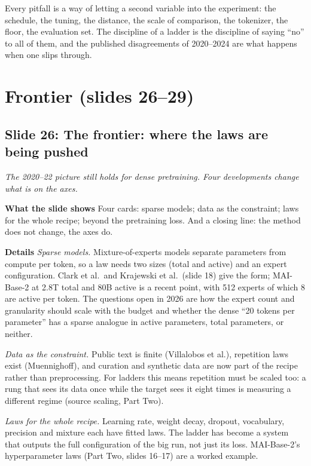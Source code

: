 \documentclass[11pt,letterpaper]{article}
\newcommand{\setstage}[1]{\colorlet{stagec}{#1}}
\newcommand{\slide}[3]{%
  \subsection[Slide #1: #2]{Slide #1: #2}%
  {\color{muted}\itshape #3\par}\medskip}
\newcommand{\para}[1]{\medskip\noindent\textbf{#1}\quad}
\newenvironment{intuition}{\begin{tcolorbox}[intuitionbox]}{\end{tcolorbox}}
\begin{document}
\begin{intuition}
Every pitfall is a way of letting a second variable into the experiment: the schedule, the tuning, the distance, the scale of comparison, the tokenizer, the floor, the evaluation set. The discipline of a ladder is the discipline of saying ``no'' to all of them, and the published disagreements of 2020--2024 are what happens when one slips through.
\end{intuition}

\setstage{vc}
\section{Frontier (slides 26--29)}

\slide{26}{The frontier: where the laws are being pushed}{The 2020--22 picture still holds for dense pretraining. Four developments change what is on the axes.}

\para{What the slide shows} Four cards: sparse models; data as the constraint; laws for the whole recipe; beyond the pretraining loss. And a closing line: the method does not change, the axes do.

\para{Details} \emph{Sparse models.} Mixture-of-experts models separate parameters from compute per token, so a law needs two sizes (total and active) and an expert configuration. Clark et al.\ and Krajewski et al.\ (slide 18) give the form; MAI-Base-2 at 2.8T total and 80B active is a recent point, with 512 experts of which 8 are active per token. The questions open in 2026 are how the expert count and granularity should scale with the budget and whether the dense ``20 tokens per parameter'' has a sparse analogue in active parameters, total parameters, or neither.

\emph{Data as the constraint.} Public text is finite (Villalobos et al.), repetition laws exist (Muennighoff), and curation and synthetic data are now part of the recipe rather than preprocessing. For ladders this means repetition must be scaled too: a rung that sees its data once while the target sees it eight times is measuring a different regime (source scaling, Part Two).

\emph{Laws for the whole recipe.} Learning rate, weight decay, dropout, vocabulary, precision and mixture each have fitted laws. The ladder has become a system that outputs the full configuration of the big run, not just its loss. MAI-Base-2's hyperparameter laws (Part Two, slides 16--17) are a worked example.
\end{document}
